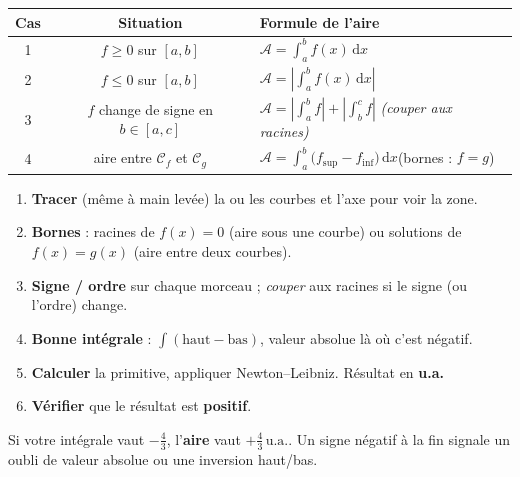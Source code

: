 \documentclass[11pt,a4paper]{article}
\newcommand{\dd}{\mathrm{d}}
\newcommand{\ua}{\,\text{u.a.}}
\begin{document}
\begin{center}
\renewcommand{\arraystretch}{1.4}
\begin{tabular}{c|c|l}
\textbf{Cas} & \textbf{Situation} & \textbf{Formule de l'aire}\\ \hline
1 & $f\geqslant 0$ sur $[a,b]$ & $\displaystyle \mathcal{A}=\int_a^b f(x)\,\dd x$\\
2 & $f\leqslant 0$ sur $[a,b]$ & $\displaystyle \mathcal{A}=\left|\int_a^b f(x)\,\dd x\right|$\\
3 & $f$ change de signe en $b\in[a,c]$ & $\displaystyle \mathcal{A}=\left|\int_a^b f\right|+\left|\int_b^c f\right|$ \emph{(couper aux racines)}\\
4 & aire entre $\mathcal{C}_f$ et $\mathcal{C}_g$ & $\displaystyle \mathcal{A}=\int_a^b\bigl(f_{\text{sup}}-f_{\text{inf}}\bigr)\,\dd x$\quad(bornes : $f=g$)\\
\end{tabular}
\end{center}

\begin{methode}
\begin{enumerate}[leftmargin=1.8em,topsep=2pt,itemsep=1.5pt]
  \item \textbf{Tracer} (même à main levée) la ou les courbes et l'axe pour voir la zone.
  \item \textbf{Bornes} : racines de $f(x)=0$ (aire sous une courbe) ou solutions de $f(x)=g(x)$
        (aire entre deux courbes).
  \item \textbf{Signe / ordre} sur chaque morceau ; \emph{couper} aux racines si le signe (ou l'ordre) change.
  \item \textbf{Bonne intégrale} : $\int(\text{haut}-\text{bas})$, valeur absolue là où c'est négatif.
  \item \textbf{Calculer} la primitive, appliquer Newton--Leibniz. Résultat en \textbf{u.a.}
  \item \textbf{Vérifier} que le résultat est \textbf{positif}.
\end{enumerate}
\end{methode}

\begin{attention}
Si votre intégrale vaut $-\tfrac{4}{3}$, l'\textbf{aire} vaut $+\tfrac{4}{3}\ua$. Un signe négatif à
la fin signale un oubli de valeur absolue ou une inversion haut/bas.
\end{attention}
\end{document}
